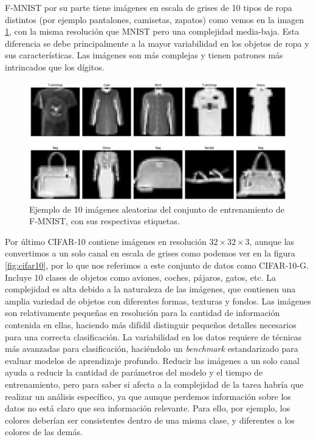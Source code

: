 F-MNIST por su parte tiene imágenes en escala de grises de 10 tipos de ropa distintos (por ejemplo pantalones, camisetas, zapatos) como vemos en la imagen \ref{fig:fmnist}, con la misma resolución que MNIST pero una complejidad media-baja. Esta diferencia se debe principalmente a la mayor variabilidad en los objetos de ropa y sus características. Las imágenes son más complejas y tienen patrones más intrincados que los dígitos.

\begin{figure}
    \centering
    \includegraphics[width=0.75\linewidth]{Plantilla_TFG_latex//imagenes//Inf//exp/fmnist.png}
    \caption{Ejemplo de 10 imágenes aleatorias del conjunto de entrenamiento de F-MNIST, con sus respectivas etiquetas.}
    \label{fig:fmnist}
\end{figure}

Por último CIFAR-10 contiene imágenes en resolución $32 \times 32 \times 3$, aunque las convertimos a un solo canal en escala de grises como podemos ver en la figura \ref{fig:cifar10}, por lo que nos referimos a este conjunto de datos como CIFAR-10-G. Incluye 10 clases de objetos como aviones, coches, pájaros, gatos, etc. La complejidad es alta debido a la naturaleza de las imágenes, que contienen una amplia variedad de objetos con diferentes formas, texturas y fondos. Las imágenes son relativamente pequeñas en resolución para la cantidad de información contenida en ellas, haciendo más difídil distinguir pequeños detalles necesarios para una correcta clasificación. La variabilidad en los datos requiere de técnicas más avanzadas para clasificación, haciéndolo un \textit{benchmark} estandarizado para evaluar modelos de aprendizaje profundo. Reducir las imágenes a un solo canal ayuda a reducir la cantidad de parámetros del modelo y el tiempo de entrenamiento, pero para saber si afecta a la complejidad de la tarea habría que realizar un análisis específico, ya que aunque perdemos información sobre los datos no está claro que sea información relevante. Para ello, por ejemplo, los colores deberían ser consistentes dentro de una misma clase, y diferentes a los colores de las demás.

